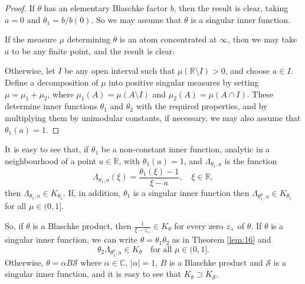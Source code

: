 \documentclass[11pt]{article}
\def\CC{\mathbb{C}}
\def\RR{\mathbb{R}}
\def\ds{\displaystyle}
\numberwithin{equation}{section}
\def\beginpf{\begin{proof}}
\def\endpf{\end{proof}}
\def\beq{\begin{equation}}
\def\eeq{\end{equation}}
\begin{document}
\beginpf If $\theta$ has an elementary Blaschke factor $b$, then the result is clear, taking $a=0$ and $\theta_1=b/b(0)$. So we may
assume that $\theta$ is a singular inner function.

If the measure $\mu$ determining $\theta$ is an atom concentrated at
$\infty$, then
we may take $a$ to be any finite point, and the result is clear.

Otherwise, let $I$ be any open interval such that $\mu(\RR \setminus I)>0$, and choose $a \in I$.
Define a decomposition of $\mu$ into positive singular measures by setting $\mu=\mu_1+\mu_2$, where $\mu_1(A)=\mu(A \setminus I)$
and $\mu_2(A)=\mu(A \cap I)$. These determine
inner functions $\theta_1$ and $\theta_2$ with the required properties, and by multiplying them
by unimodular constants, if necessary, we may also assume that $\theta_1(a)=1$.
\endpf

It is easy to see that, if $\theta_1$ be a non-constant inner function, analytic in a neighbourhood of a point $a \in \RR $, with $\theta_1(a)=1$, and $\Lambda_{\theta_1,a}$ is the function
\beq \label{2.4}
\Lambda_{\theta_1,a}(\xi)=\frac{\theta_1(\xi)-1}{\xi-a}, \quad \xi \in \RR,
\eeq
then $\Lambda_{\theta_1,a} \in K_{\theta_1}$. If, in addition, $\theta_1$ is a singular inner function then
 $\Lambda_{\theta_1^\mu,a} \in K_{\theta_1}$ for all $\mu\in (0,1]$.



So, if $\theta$ is a Blaschke product, then $\ds \frac{1}{\xi-\overline {z_+}}\in K_\theta$ for every zero $z_+$ of $\theta$. If $\theta$ is a singular inner function, we can write $\theta=\theta_1 \theta_2$ as in Theorem \ref{lem:16} and
\[
\theta_2\Lambda_{\theta_1^\mu,a} \in K_{\theta} \quad \text{for all } \mu \in (0,1].
\]
Otherwise, $\theta=\alpha B\mathcal{S}$ where $\alpha \in \CC$, $|\alpha|=1$, $B$ is a Blaschke product and $\mathcal{S}$ is a singular inner function, and it is easy to see that $K_\theta \supset K_\mathcal{S}$.\\
\end{document}
